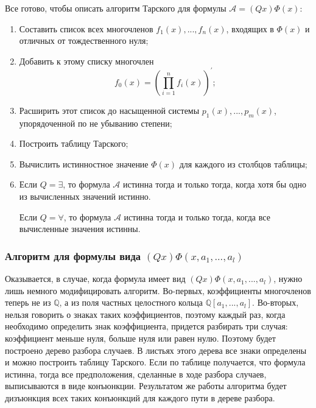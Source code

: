 Все готово, чтобы описать алгоритм Тарского для формулы $\mathcal{A} = (Qx)\Phi(x)$:
\begin{enumerate}
    \item Составить список всех многочленов $f_1(x), ... , f_n(x)$, входящих в $\Phi(x)$ и отличных от тождественного нуля;
    \item Добавить к этому списку многочлен 
    \begin{equation*}
        f_0(x) = \left( \prod\limits_{i = 1}^n f_i(x) \right)^\prime;
    \end{equation*}
    \item Расширить этот список до насыщенной системы $p_1(x), ... , p_m(x)$, упорядоченной по не убыванию степени;
    \item Построить таблицу Тарского; 
    \item Вычислить истинностное значение $\Phi(x)$ для каждого из столбцов таблицы;
    \item Если $Q = \exists$, то формула $\mathcal{A}$ истинна тогда и только тогда, когда хотя бы одно из вычисленных значений истинно. 
    
    Если $Q = \forall$, то формула $\mathcal{A}$ истинна тогда и только тогда, когда все вычисленные значения истинны.
\end{enumerate}

\subsubsection{Алгоритм для формулы вида $(Qx)\Phi(x, a_1, ... , a_l)$}

Оказывается, в случае, когда формула имеет вид $(Qx)\Phi(x, a_1, ... , a_l)$, нужно лишь немного модифицировать алгоритм. Во-первых, коэффициенты многочленов теперь не из $\mathbb{Q}$, а из поля частных целостного кольца $\mathbb{Q}\left[a_1, ... , a_l\right]$. Во-вторых, нельзя говорить о знаках таких коэффициентов, поэтому каждый раз, когда необходимо определить знак коэффициента, придется разбирать три случая: коэффициент меньше нуля, больше нуля или равен нулю. Поэтому будет построено дерево разбора случаев. В листьях этого дерева все знаки определены и можно построить таблицу Тарского. Если по таблице получается, что формула истинна, тогда все предположения, сделанные в ходе разбора случаев, выписываются в виде конъюнкции. Результатом же работы алгоритма будет дизъюнкция всех таких конъюнкций для каждого пути в дереве разбора.

